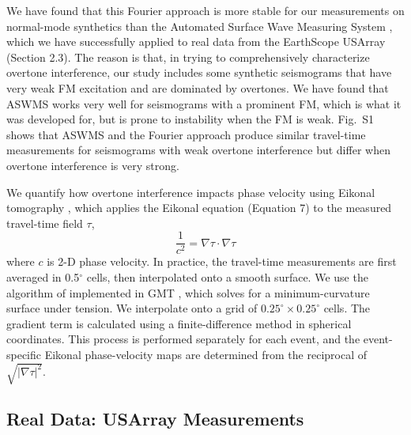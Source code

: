 \documentclass[extra,mreferee]{gji}
\begin{document}
We have found that this Fourier approach is more stable for our measurements on normal-mode synthetics than the Automated Surface Wave Measuring System \citep{jingmcc}, which we have successfully applied to real data from the EarthScope USArray (Section 2.3). The reason is that, in trying to comprehensively characterize overtone interference, our study includes some synthetic seismograms that have very weak FM excitation and are dominated by overtones. We have found that ASWMS works very well for seismograms with a prominent FM, which is what it was developed for, but is prone to instability when the FM is weak. Fig.\ S1 shows that ASWMS and the Fourier approach produce similar travel-time measurements for seismograms with weak overtone interference but differ when overtone interference is very strong.  

We quantify how overtone interference impacts phase velocity using Eikonal tomography \citep{lin2009eikonal}, which applies the Eikonal equation (Equation 7) to the measured travel-time field $\tau$,  
\begin{equation}
\frac{1}{c^2} = \nabla \tau \cdot \nabla \tau
\end{equation}
\noindent
where $c$ is 2-D phase velocity. In practice, the travel-time measurements are first averaged in 0.5$^\circ$ cells, then interpolated onto a smooth surface. We use the algorithm of \citet{smith1990gridding} implemented in GMT \citep{wessel1998new}, which solves for a minimum-curvature surface under tension. We interpolate onto a grid of $0.25^\circ \times 0.25^\circ$ cells. The gradient term is calculated using a finite-difference method in spherical coordinates. This process is
performed separately for each event, and the event-specific Eikonal phase-velocity maps are determined from the reciprocal of $\sqrt{|\nabla \tau|^2}$. 

\subsection{Real Data: USArray Measurements}
\end{document}
